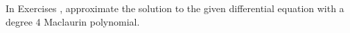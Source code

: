 {\noindent In Exercises}
{, approximate the solution to the given differential equation with a degree 4 Maclaurin polynomial.
}

